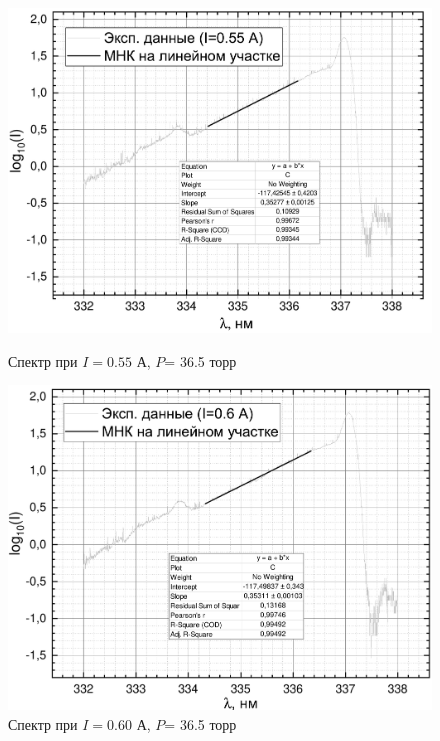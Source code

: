 \begin{figure}[H]
\begin{minipage}{0.45\linewidth}
		\includegraphics[width=\linewidth]{data/graph_I=0,55_polosa}
		\caption{Спектр при $I= 0.55 $ А, $P$= 36.5 торр}
		\label{polosa_55}	
	\end{minipage} 
	\hfill
	\begin{minipage}[H]{0.45\linewidth}
		\centering
		\includegraphics[width=\linewidth]{data/graph_I=0,60_polosa}
		\caption{Спектр при $I= 0.60 $ А, $P$= 36.5 торр}
		\label{polosa_60}
	\end{minipage}
	\begin{minipage}{0.45\linewidth}
		\centering

\end{minipage}
\end{figure}
